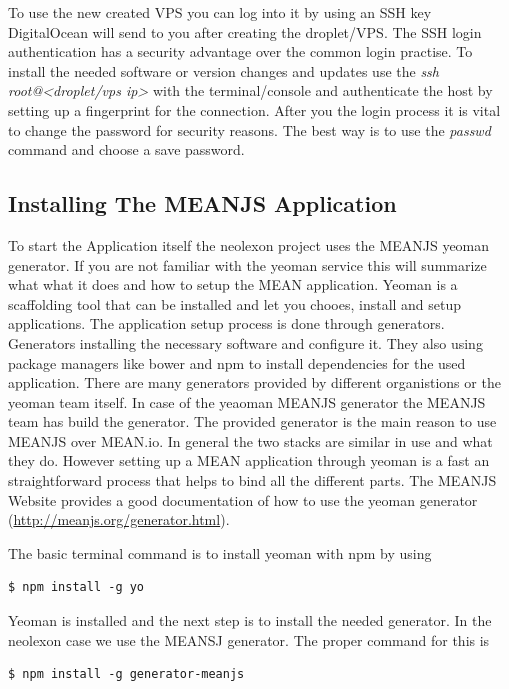 To use the new created VPS you can log into it by using an SSH key DigitalOcean will send to you after creating the droplet/VPS. The SSH login authentication has a security
advantage over the common login practise. To install the needed software or version changes and updates use the \textit{ssh root@<droplet/vps ip>} with
the terminal/console and authenticate the host by setting up a fingerprint for the connection. After you the login process it is vital to change the password for
security reasons. The best way is to use the \textit{passwd} command and choose a save password.

\subsection{Installing The MEANJS Application}
To start the Application itself the neolexon project uses the MEANJS yeoman generator. If you are not familiar with the yeoman service this will summarize what what
it does and how to setup the MEAN application. Yeoman is a scaffolding tool that can be installed and let you chooes, install and setup applications. The
application setup process is done through generators. Generators installing the necessary software and configure it. They also using package managers like bower
and npm to install dependencies for the used application. There are many generators provided by different organistions or the yeoman team itself. In case of the
yeaoman MEANJS generator the MEANJS team has build the generator. The provided generator is the main reason to use MEANJS over MEAN.io. In general the two stacks
are similar in use and what they do. However setting up a MEAN application through yeoman is a fast an straightforward process that helps to bind all the different
parts. The MEANJS Website provides a good documentation of how to use the yeoman generator (\url{http://meanjs.org/generator.html}).

The basic terminal command is to install yeoman with npm by using

\begin{lstlisting}
$ npm install -g yo
\end{lstlisting}

Yeoman is installed and the next step is to install the needed generator. In the neolexon case we use the MEANSJ generator. The proper command for this is

\begin{lstlisting}
$ npm install -g generator-meanjs
\end{lstlisting}


